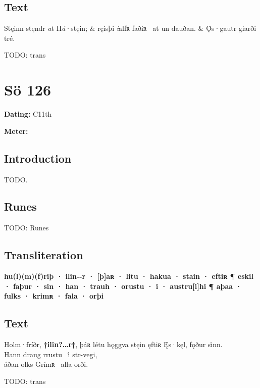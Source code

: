 \subsection{Text}

\bvg\bva[]%
Stęinn stęndr \emph{a}t H\emph{á}·stęin; &
ręisþi \emph{i}alfʀ faðiʀ \hld\ at un dauðan. &
Ǫ̇s·gautr giarði tré.\eva

\bvb TODO: trans\evb\evg

\sectionline\clearpage


\section{Sö 126}

\begin{flushright}%
\textbf{Dating:} C11th

\textbf{Meter:} \Fornyrdislag
\end{flushright}%

\subsection{Introduction}

TODO.

\subsection{Runes}

TODO: Runes%

\subsection{Transliteration}

\textbf{hu(l)(m)(f)riþ · ilin-{}-r · [þ]aʀ · litu · hakua · stain · eftiʀ ¶ eskil · faþur · sin · han · trauh · orustu · i · austru[i]hi ¶ aþaa · fulks · krimʀ · fala · orþi}

\subsection{Text}

\bpg\bpa[0]%
\startsub Holm·fríðr, \textbf{†ilin?\dots r†}, þáʀ létu hǫggva stęin ęftiʀ Ę̇s·kęl, fǫður si̇nn.\endsub \\
Hann draug rrustu \hld\ i̇́ str-vegi, \\
áðan olks Grímʀ \hld\ alla orði.\epa

\bpb TODO: trans\epb\epg

